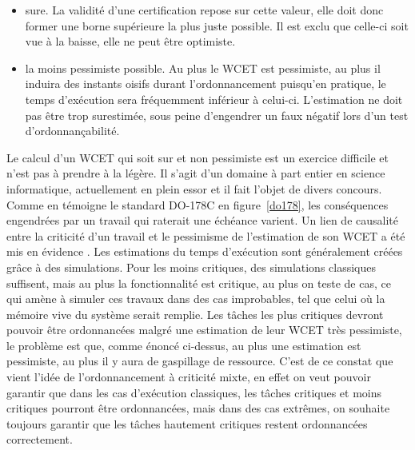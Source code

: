 \documentclass[a4paper]{report}
\theoremstyle{break}
\theoremstyle{breakplain}
\begin{document}
\begin{itemize}
\item sure. La validité d'une certification repose sur cette valeur, elle doit donc former une borne supérieure la plus juste possible. Il est exclu que celle-ci soit vue à la baisse, elle ne peut être optimiste.
\item la moins pessimiste possible. Au plus le WCET est pessimiste, au plus il induira des instants oisifs durant l'ordonnancement puisqu'en pratique, le temps d'exécution sera fréquemment inférieur à celui-ci. L'estimation ne doit pas être trop surestimée, sous peine d'engendrer un faux négatif lors d'un test d'ordonnançabilité.
\end{itemize}
Le calcul d'un WCET qui soit sur et non pessimiste est un exercice difficile et n'est pas à prendre à la légère. Il s'agit d'un domaine à part entier en science informatique, actuellement en plein essor et il fait l'objet de divers concours.\\

Comme en témoigne le standard DO-178C en figure~\ref{do178}, les conséquences engendrées par un travail qui raterait une échéance varient. Un lien de causalité entre la criticité d'un travail et le pessimisme de l'estimation de son WCET a été mis en évidence \cite{vestal2007preemptive}. Les estimations du temps d'exécution sont généralement créées grâce à des simulations. Pour les moins critiques, des simulations classiques suffisent, mais au plus la fonctionnalité est critique, au plus on teste de cas, ce qui amène à simuler ces travaux dans des cas improbables, tel que celui où la mémoire vive du système serait remplie. Les tâches les plus critiques devront pouvoir être ordonnancées malgré une estimation de leur WCET très pessimiste, le problème est que, comme énoncé ci-dessus, au plus une estimation est pessimiste, au plus il y aura de gaspillage de ressource. C'est de ce constat que vient l'idée de l'ordonnancement à criticité mixte, en effet on veut pouvoir garantir que dans les cas d'exécution classiques, les tâches critiques et moins critiques pourront être ordonnancées, mais dans des cas extrêmes, on souhaite toujours garantir que les tâches hautement critiques restent ordonnancées correctement.\\
\end{document}
